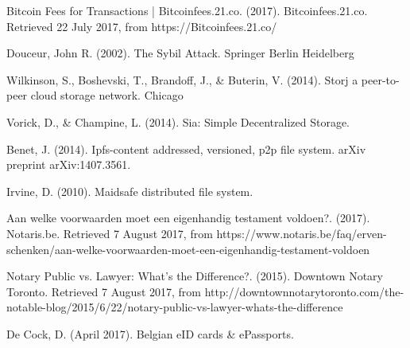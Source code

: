 \begin{thebibliography}{99}
Bitcoin Fees for Transactions | Bitcoinfees.21.co. (2017). Bitcoinfees.21.co. Retrieved 22 July 2017, from https://Bitcoinfees.21.co/


Douceur, John R. (2002). The Sybil Attack. Springer Berlin Heidelberg


Wilkinson, S., Boshevski, T., Brandoff, J., \& Buterin, V. (2014). Storj a peer-to-peer cloud storage network. Chicago 

Vorick, D., \& Champine, L. (2014). Sia: Simple Decentralized Storage.

Benet, J. (2014). Ipfs-content addressed, versioned, p2p file system. arXiv preprint arXiv:1407.3561.

Irvine, D. (2010). Maidsafe distributed file system.

Aan welke voorwaarden moet een eigenhandig testament voldoen?. (2017). Notaris.be. Retrieved 7 August 2017, from https://www.notaris.be/faq/erven-schenken/aan-welke-voorwaarden-moet-een-eigenhandig-testament-voldoen

Notary Public vs. Lawyer: What's the Difference?. (2015). Downtown Notary Toronto. Retrieved 7 August 2017, from http://downtownnotarytoronto.com/the-notable-blog/2015/6/22/notary-public-vs-lawyer-whats-the-difference

De Cock, D. (April 2017). Belgian eID cards \& ePassports.

\end{thebibliography}
